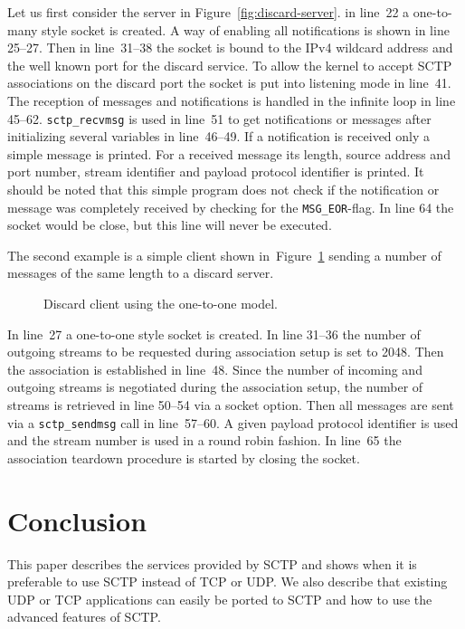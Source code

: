 \documentclass[conference]{IEEEtran}
\begin{document}
Let us first consider the server in Figure~\ref{fig:discard-server}.
in line~22 a one-to-many style socket is created. A way of enabling
all notifications is shown in line 25--27. Then in line~31--38
the socket is bound to the IPv4 wildcard address and the well known port
for the discard service. To allow the kernel to accept SCTP
associations on the discard port the socket is put into listening
mode in line~41. 
The reception of messages and notifications is handled in the
infinite loop in line 45--62. \texttt{sctp\_recvmsg} is used in 
line~51 to get notifications or messages after initializing
several variables in line~46--49. If a notification is received
only a simple message is printed. For a received message its
length, source address and port number, stream identifier and
payload protocol identifier is printed. It should be noted that
this simple program does not check if the notification or message
was completely received by checking for the \texttt{MSG\_EOR}-flag.
In line 64 the socket would be close, but this line will never be
executed.

The second example is a simple client shown in~Figure~\ref{fig:discard-client}
sending a number of messages of the same length to a discard server.

\begin{figure}[h]
\lstset{numbers=left, frame=single, basicstyle=\footnotesize,}

\caption{Discard client using the one-to-one model.}
\label{fig:discard-client}
\end{figure}

In line~27 a one-to-one style socket is created. In line 31--36 the
number of outgoing streams to be requested during association setup
is set to 2048. Then the association is established in line~48. Since 
the number of incoming and outgoing streams is negotiated during the
association setup, the number of streams is retrieved in line 50--54
via a socket option. Then all messages are sent via a \texttt{sctp\_sendmsg}
call in line~57--60. A given payload protocol identifier is used and the
stream number is used in a round robin fashion. In line~65 the
association teardown procedure is started by closing the socket.

\section{Conclusion}
This paper describes the services provided by SCTP and shows
when it is preferable to use SCTP instead of TCP or UDP.
We also describe that existing UDP or TCP applications can
easily be ported to SCTP and how to use the advanced features
of SCTP.
\end{document}
